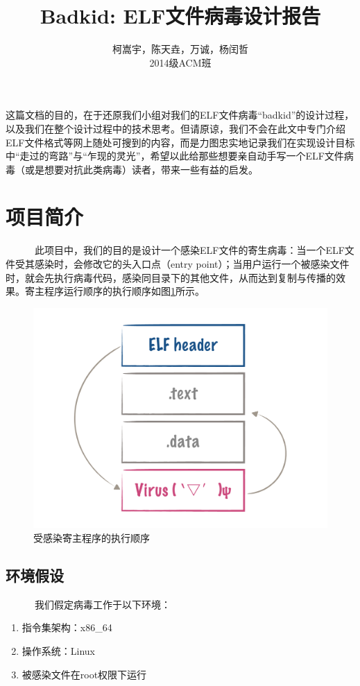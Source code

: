 \documentclass[11pt]{article}
\begin{document}
\title{Badkid: ELF文件病毒设计报告}

\author{柯嵩宇，陈天垚，万诚，杨闰哲\vspace{1em} \\ 2014级ACM班}
\maketitle

这篇文档的目的，在于还原我们小组对我们的ELF文件病毒“badkid”的设计过程，以及我们在整个设计过程中的技术思考。但请原谅，我们不会在此文中专门介绍ELF文件格式等网上随处可搜到的内容，而是力图忠实地记录我们在实现设计目标中“走过的弯路”与“乍现的灵光”，希望以此给那些想要亲自动手写一个ELF文件病毒（或是想要对抗此类病毒）读者，带来一些有益的启发。

\tableofcontents
\newpage
\section{项目简介}
	~~~~~~此项目中，我们的目的是设计一个感染ELF文件的寄生病毒：当一个ELF文件受其感染时，会修改它的头入口点（entry point）；当用户运行一个被感染文件时，就会先执行病毒代码，感染同目录下的其他文件，从而达到复制与传播的效果。寄主程序运行顺序的执行顺序如图\ref{fig:order}所示。
	\vspace{1em}
	\begin{figure}[htbp]
		\centering
		\includegraphics[width = \textwidth]{figures/fig1_order}
		\caption{受感染寄主程序的执行顺序}
		\label{fig:order}
	\end{figure}
\subsection{环境假设}	
	~~~~~~我们假定病毒工作于以下环境：
	\begin{enumerate}
		\item 指令集架构：x86\_64
		\item 操作系统：Linux
		\item 被感染文件在root权限下运行
	\end{enumerate}
	
\end{document}
